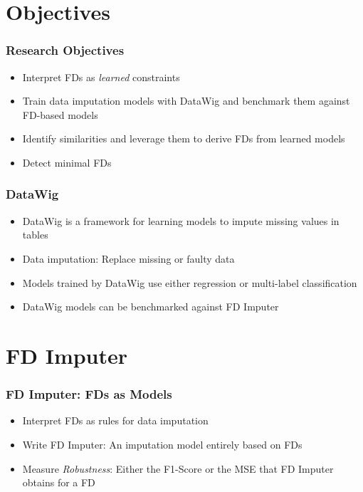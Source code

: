 \documentclass{beamer}
\begin{document}
\section{Objectives}
\begin{frame}
    \frametitle{Research Objectives}
    \begin{itemize}
        \item Interpret FDs as \emph{learned} constraints
        \item Train data imputation models with DataWig and benchmark them against FD-based models
        \item Identify similarities and leverage them to derive FDs from learned models
        \item Detect minimal FDs
    \end{itemize}
\end{frame}

\begin{frame}
    \frametitle{DataWig}
    \begin{itemize}
        \item DataWig is a framework for learning models to impute missing values in tables
        \item Data imputation: Replace missing or faulty data
        \item Models trained by DataWig use either regression or multi-label classification
        \item DataWig models can be benchmarked against FD Imputer
    \end{itemize}
\end{frame}

\section{FD Imputer}
\begin{frame}
    \frametitle{FD Imputer: FDs as Models}
    \begin{itemize}
        \item Interpret FDs as rules for data imputation
        \item Write FD Imputer: An imputation model entirely based on FDs
        \item Measure \emph{Robustness}: Either the F1-Score or the MSE that FD Imputer obtains for a FD
    \end{itemize}
\end{frame}
\end{document}
